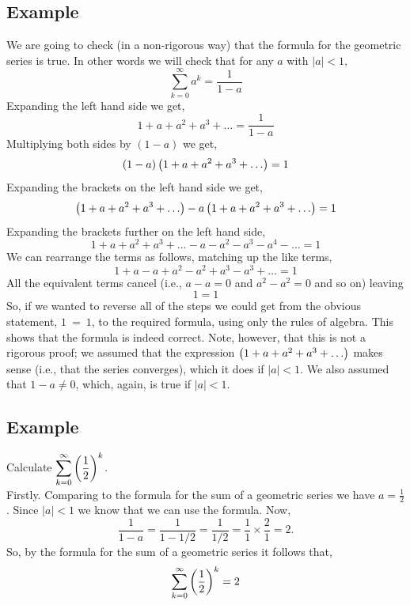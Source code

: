 \subsection{Example}
We are going to check (in a non-rigorous way) that the formula for the geometric series is true. In other words we will check that for any $a$ with $|a| < 1,$
\[
\displaystyle{\sum_{k=0}^\infty a^k = \frac{1}{1-a}}
\]
Expanding the left hand side we get,
\[
1 + a + a^2 + a^3 + \ldots = \frac{1}{1-a}
\]
Multiplying both sides by $(1-a)$ we get,
\[
(1-a)\left(1 + a + a^2 + a^3 + \ldots\right) = 1
\]
Expanding the brackets on the left hand side we get,
\[
\left(1 + a + a^2 + a^3 + \ldots\right) - a\left(1 + a + a^2 + a^3 + \ldots\right) = 1
\]
Expanding the brackets further on the left hand side,
\[
1 + a + a^2 + a^3 + \ldots - a - a^2 - a^3 - a^4 - \ldots = 1
\]
We can rearrange the terms as follows, matching up the like terms,
\[
1 + a - a + a^2 - a^2 + a^3 - a^3 + \ldots = 1
\]
All the equivalent terms cancel (i.e., $a - a = 0$ and $a^2 - a^2 = 0$ and so on) leaving
\[
1 = 1
\]
So, if we wanted to reverse all of the steps we could get from the obvious statement, $1~=~1$, to the required formula, using only the rules of algebra. This shows that the formula is indeed correct. Note, however, that this is not a rigorous proof; we assumed that the expression $\left(1 + a + a^2 + a^3 + \ldots\right)$ makes sense (i.e., that the series converges), which it does if $|a| < 1$. We also assumed that $1-a \neq 0$, which, again, is true if $|a| < 1.$

\subsection{Example}
Calculate $\displaystyle{\sum_{k=0}^\infty \left(\frac{1}{2}\right)^k}$. \\

Firstly. Comparing to the formula for the sum of a geometric series we have $a = \frac{1}{2}$. Since $|a| < 1$ we know that we can use the formula. Now,
\[
\frac{1}{1-a} = \frac{1}{1-1/2} = \frac{1}{1/2} = \frac{1}{1}\times\frac{2}{1} = 2.
\]
So, by the formula for the sum of a geometric series it follows that,
\[
\sum_{k=0}^\infty \left(\frac{1}{2}\right)^k = 2
\]

